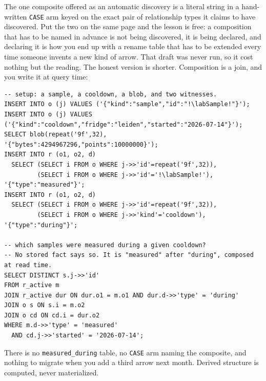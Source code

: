 The one composite offered as an automatic discovery is a literal string in a hand-written \texttt{CASE} arm keyed on the exact pair of relationship types it claims to have discovered. Put the two on the same page and the lesson is free: a composition that has to be named in advance is not being discovered, it is being declared, and declaring it is how you end up with a rename table that has to be extended every time someone invents a new kind of arrow. That draft was never run, so it cost nothing but the reading. The honest version is shorter. Composition is a join, and you write it at query time:

\begin{lstlisting}
-- setup: a sample, a cooldown, a blob, and two witnesses.
INSERT INTO o (j) VALUES ('{"kind":"sample","id":"!\labSample!"}');
INSERT INTO o (j) VALUES ('{"kind":"cooldown","fridge":"leiden","started":"2026-07-14"}');
SELECT blob(repeat('9f',32), '{"bytes":4294967296,"points":10000000}');
INSERT INTO r (o1, o2, d)
  SELECT (SELECT i FROM o WHERE j->>'id'=repeat('9f',32)),
         (SELECT i FROM o WHERE j->>'id'='!\labSample!'), '{"type":"measured"}';
INSERT INTO r (o1, o2, d)
  SELECT (SELECT i FROM o WHERE j->>'id'=repeat('9f',32)),
         (SELECT i FROM o WHERE j->>'kind'='cooldown'), '{"type":"during"}';

-- which samples were measured during a given cooldown?
-- No stored fact says so. It is "measured" after "during", composed at read time.
SELECT DISTINCT s.j->>'id'
FROM r_active m
JOIN r_active dur ON dur.o1 = m.o1 AND dur.d->>'type' = 'during'
JOIN o s ON s.i = m.o2
JOIN o cd ON cd.i = dur.o2
WHERE m.d->>'type' = 'measured'
  AND cd.j->>'started' = '2026-07-14';
\end{lstlisting}

There is no \texttt{measured\_during} table, no \texttt{CASE} arm naming the composite, and nothing to migrate when you add a third arrow next month. Derived structure is computed, never materialized.


